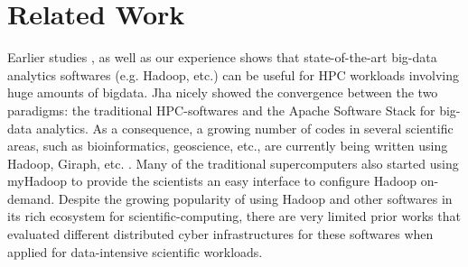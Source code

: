 \documentclass[conference]{IEEEtran}
\begin{document}
\section {Related Work} \label{Related Work}
Earlier studies \cite{schadoop:fadika} \cite{schadoop:jha}, as well as our experience shows that state-of-the-art big-data analytics softwares (e.g. Hadoop, etc.) can be useful for HPC workloads involving huge amounts of bigdata. 
Jha \cite{schadoop:jha} nicely showed the convergence between the two paradigms: the traditional HPC-softwares and the Apache Software Stack for big-data analytics. 
As a consequence, a growing number of codes in several scientific areas, such as bioinformatics, geoscience, etc., are currently being written using Hadoop, Giraph, etc. \cite{fw:myhadoop}. 
Many of the traditional supercomputers also started using myHadoop \cite{fw:myhadoop} to provide the scientists an easy interface to configure Hadoop on-demand. 
Despite the growing popularity of using Hadoop and other softwares in its rich ecosystem for scientific-computing, there are very limited prior works that evaluated different distributed cyber infrastructures for these softwares when applied for data-intensive scientific workloads.

\end{document}
